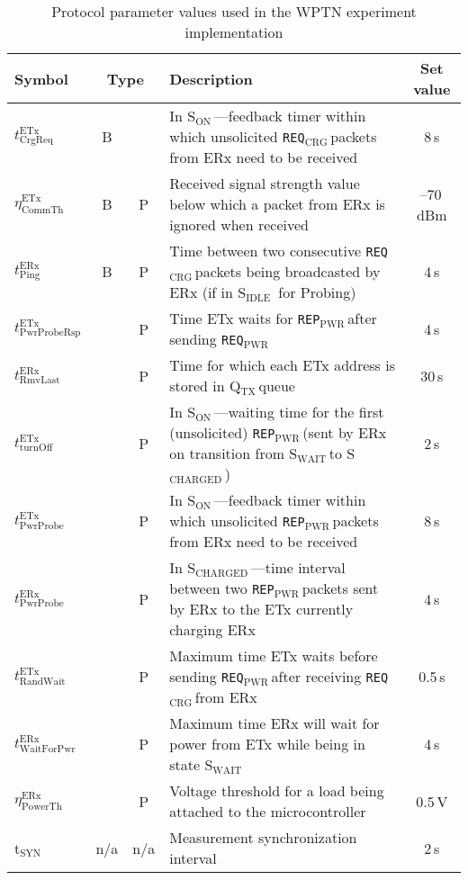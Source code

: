 \documentclass[11pt,draftclsnofoot,journal,onecolumn]{IEEEtran}
\newcommand{\textsubscript}[1]{$_{\text{#1}}$}
\newcommand{\txStateOn}{\textsf{S\textsubscript{ON}}\,}
\newcommand{\rxStateIdle}{\textsf{S\textsubscript{IDLE}}\,}
\newcommand{\rxStateWaiting}{\textsf{S\textsubscript{WAIT}}\,}
\newcommand{\rxStateCharged}{\textsf{S\textsubscript{CHARGED}}\,}
\newcommand{\txTimeoutBeaconing}{$t^{\text{ETx}}_\text{CrgReq}$}
\newcommand{\txTimeoutPowerProbeResponse}{$t^{\text{ETx}}_\text{PwrProbeRsp}$}
\newcommand{\txTurnOffFirstPwrProbeNotReceivedAfter}{$t^\text{ETx}_\text{turnOff}$}
\newcommand{\txTimeoutProbeReceive}{$t^\text{ETx}_\text{PwrProbe}$}
\newcommand{\txRssiThreshold}{$\eta^\text{ETx}_\text{CommTh}$}
\newcommand{\txRandomWaitTimeMax}{$t^\text{ETx}_\text{RandWait}$}
\newcommand{\rxDelayPing}{$t^\text{ERx}_\text{Ping}$}
\newcommand{\rxDelayRemoveLastProbeSender}{$t^\text{ERx}_\text{RmvLast}$}
\newcommand{\rxDelayWaitingForPower}{$t^\text{ERx}_\text{WaitForPwr}$}
\newcommand{\rxDelayPowerProbing}{$t^\text{ERx}_\text{PwrProbe}$}
\newcommand{\rxVoltageThreshold}{$\eta^\text{ERx}_\text{PowerTh}$}
\newcommand{\chargingRequest}{\texttt{REQ\textsubscript{CRG}}\,}
\newcommand{\powerProbeReport}{\texttt{REP\textsubscript{PWR}}\,}
\newcommand{\powerProbeRequest}{\texttt{REQ\textsubscript{PWR}}\,}
\newcommand{\txAddressQueue}{Q\textsubscript{TX}\,}
\newcommand{\tSyn}{t\textsubscript{SYN}\,}
\begin{document}
\begin{table*}
\centering
\caption{Protocol parameter values used in the WPTN experiment implementation}
\vspace{-0.25cm}
\begin{threeparttable}
\begin{center}
\scriptsize
\begin{tabular}{| l | c c | l | c}
\hline
Symbol & \multicolumn{2}{c|}{Type\tnote{a}} & Description & Set value\\
\hline\hline
\txTimeoutBeaconing & B & & In \txStateOn---feedback timer within which unsolicited \chargingRequest packets from ERx need to be received & 8\,s\\
\hline
\txRssiThreshold & B & P & Received signal strength value below which a packet from ERx is ignored when received\tnote{b} & --70\,dBm\\
\hline
\rxDelayPing & B & P & Time between two consecutive \chargingRequest packets being broadcasted by ERx (if in \rxStateIdle\! for Probing) & 4\,s\\
\hline
\txTimeoutPowerProbeResponse & & P & Time ETx waits for \powerProbeReport after sending \powerProbeRequest & 4\,s\\
\hline
\rxDelayRemoveLastProbeSender & & P & Time for which each ETx address is stored in \txAddressQueue queue & 30\,s\\
\hline
\txTurnOffFirstPwrProbeNotReceivedAfter & & P & In \txStateOn---waiting time for the first (unsolicited) \powerProbeReport (sent by ERx on transition from \rxStateWaiting to \rxStateCharged\!) & 2\,s\\
\hline
\txTimeoutProbeReceive & & P & In \txStateOn---feedback timer within which unsolicited \powerProbeReport packets from ERx need to be received & 8\,s\\
\hline
\rxDelayPowerProbing & & P & In \rxStateCharged---time interval between two \powerProbeReport packets sent by ERx to the ETx currently charging ERx & 4\,s\\
\hline
\txRandomWaitTimeMax & & P & Maximum time ETx waits before sending \powerProbeRequest after receiving \chargingRequest from ERx\tnote{c}& 0.5\,s\\
\hline
\rxDelayWaitingForPower & & P & Maximum time ERx will wait for power from ETx while being in state \rxStateWaiting & 4\,s\\
\hline
\rxVoltageThreshold & & P & Voltage threshold for a load being attached to the microcontroller\tnote{d} & 0.5\,V\\
\hline
\tSyn & n/a & n/a & Measurement synchronization interval\tnote{e} & 2\,s\\
\hline
\end{tabular}


\end{center}
\end{threeparttable}
\end{table*}
\end{document}
